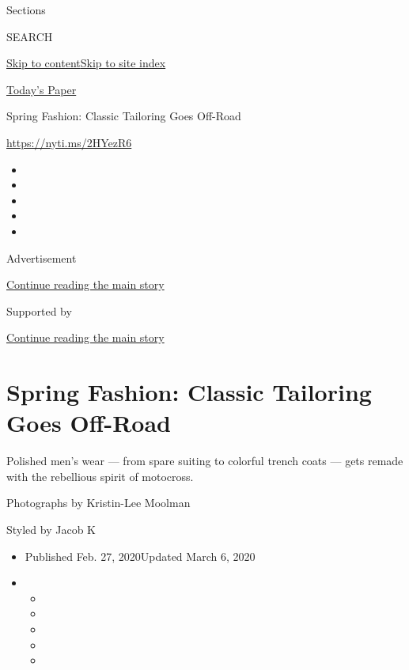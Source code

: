 Sections

SEARCH

\protect\hyperlink{site-content}{Skip to
content}\protect\hyperlink{site-index}{Skip to site index}

\href{https://myaccount.nytimes3xbfgragh.onion/auth/login?response_type=cookie\&client_id=vi}{}

\href{https://www.nytimes3xbfgragh.onion/section/todayspaper}{Today's
Paper}

Spring Fashion: Classic Tailoring Goes Off-Road

\url{https://nyti.ms/2HYezR6}

\begin{itemize}
\item
\item
\item
\item
\item
\end{itemize}

Advertisement

\protect\hyperlink{after-top}{Continue reading the main story}

Supported by

\protect\hyperlink{after-sponsor}{Continue reading the main story}

\hypertarget{spring-fashion-classic-tailoring-goes-off-road}{%
\section{Spring Fashion: Classic Tailoring Goes
Off-Road}\label{spring-fashion-classic-tailoring-goes-off-road}}

Polished men's wear --- from spare suiting to colorful trench coats ---
gets remade with the rebellious spirit of motocross.

Photographs by Kristin-Lee Moolman

Styled by Jacob K

\begin{itemize}
\item
  Published Feb. 27, 2020Updated March 6, 2020
\item
  \begin{itemize}
  \item
  \item
  \item
  \item
  \item
  \end{itemize}
\end{itemize}

